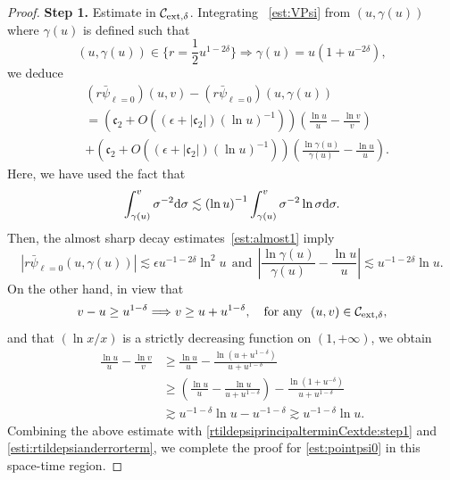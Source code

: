 \documentclass[a4paper,reqno]{amsart}
\theoremstyle{definition}
\numberwithin{equation}{section}
\def \d {{\rm{d}}}
\def\ep{\epsilon}
\def\lab{\label}
\begin{document}
\begin{proof}
\smallskip
\textbf{Step 1.} Estimate in $\mathcal{C}_{{\rm{ext}},\delta}$.
Integrating ~\eqref{est:VPsi} from $(u,\gamma(u))$ where $\gamma(u)$ is defined such that 
\begin{equation*}
    (u,\gamma(u))\in \big\{r=\frac{1}{2}u^{1-2\delta}\big\}\Longrightarrow \gamma(u)=u\left(1+u^{-2\delta}\right),
\end{equation*}
we deduce
\begin{equation}
\lab{rtildepsiprincipalterminCextde:step1}
\begin{aligned}
&(r\bar{\psi}_{\ell=0})(u,v)-(r\bar{\psi}_{\ell=0})(u,\gamma(u))\\
&=\left(\mathfrak{c}_{2}+O((\ep+|\mathfrak{c}_2|)(\ln u)^{-1})\right)\left(\frac{\ln u}{u}-\frac{\ln v}{v}\right)\\
&+\left(\mathfrak{c}_{2}+O((\ep+|\mathfrak{c}_2|)(\ln u)^{-1})\right)\left(\frac{\ln \gamma(u)}{\gamma(u)}-\frac{\ln u}{u}\right).
\end{aligned}
\end{equation}
Here, we have used the fact that 
\begin{equation*}
    \int_{\gamma(u)}^{v}\sigma^{-2}\d \sigma\lesssim \left(\ln u\right)^{-1}\int_{\gamma(u)}^{v}\sigma^{-2}\ln \sigma \d \sigma.
\end{equation*}
Then, the almost sharp decay estimates~\eqref{est:almost1} imply
\begin{equation}
\lab{esti:rtildepsianderrorterm}
    \left|r\bar{\psi}_{\ell=0}(u,\gamma(u))\right|\lesssim \ep u^{-1-2\delta}\ln^{2}u 
    \ \  \mbox{and}\ \  \left|\frac{\ln \gamma(u)}{\gamma(u)}-\frac{\ln u}{u}\right|\lesssim u^{-1-2\delta}\ln u.
\end{equation}
On the other hand, in view that 
\begin{equation*}
v-u\ge u^{1-\delta}\Longrightarrow 
v\ge u+u^{1-\delta}, \quad \mbox{for any} \ \ (u,v)\in\mathcal{C}_{{\rm{ext}},\delta},
\end{equation*}
and that $(\ln x/x)$ is a strictly decreasing function on $(1,+\infty)$, we obtain
\begin{equation*}
\begin{aligned}
\frac{\ln u}{u}-\frac{\ln v}{v}
&\ge \frac{\ln u}{u}-\frac{\ln (u+u^{1-\delta})}{u+u^{1-\delta}}\\
&\ge \left(\frac{\ln u}{u}-\frac{\ln u}{u+u^{1-\delta}}\right)
-\frac{\ln \left(1+u^{-\delta}\right)}{u+u^{1-\delta}}
\\
&\gtrsim u^{-1-\delta}\ln u-u^{-1-\delta}\gtrsim u^{-1-\delta}\ln u.
\end{aligned}
\end{equation*}
Combining the above estimate with \eqref{rtildepsiprincipalterminCextde:step1} and \eqref{esti:rtildepsianderrorterm},
 we complete the proof for \eqref{est:pointpsi0} in this space-time region.


\end{proof}
\end{document}
